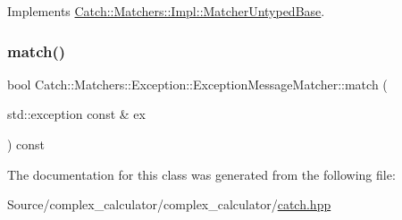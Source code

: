 Implements \mbox{\hyperlink{class_catch_1_1_matchers_1_1_impl_1_1_matcher_untyped_base_a91d3a907dbfcbb596077df24f6e11fe2}{Catch\+::\+Matchers\+::\+Impl\+::\+Matcher\+Untyped\+Base}}.

\mbox{\label{class_catch_1_1_matchers_1_1_exception_1_1_exception_message_matcher_aa0566d24990d69e96495360b8f79593d}} 
\subsubsection{\texorpdfstring{match()}{match()}}
{\footnotesize\ttfamily bool Catch\+::\+Matchers\+::\+Exception\+::\+Exception\+Message\+Matcher\+::match (\begin{DoxyParamCaption}\item[{std\+::exception const \&}]{ex }\end{DoxyParamCaption}) const\hspace{0.3cm}{\ttfamily [override]}}



The documentation for this class was generated from the following file\+:\begin{DoxyCompactItemize}
\item 
Source/complex\+\_\+calculator/complex\+\_\+calculator/\mbox{\hyperlink{catch_8hpp}{catch.\+hpp}}\end{DoxyCompactItemize}
